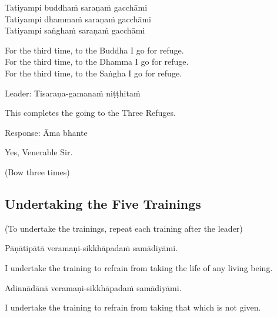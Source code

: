 Tatiyampi buddhaṁ saraṇaṁ gacchāmi\\
Tatiyampi dhammaṁ saraṇaṁ gacchāmi\\
Tatiyampi saṅghaṁ saraṇaṁ gacchāmi

\begin{english-verses}
  For the third time, to the Buddha I go for refuge.\\
  For the third time, to the Dhamma I go for refuge.\\
  For the third time, to the Saṅgha I go for refuge.
\end{english-verses}

Leader: Tisaraṇa-gamanaṁ niṭṭhitaṁ

\begin{english}
  This completes the going to the Three Refuges.
\end{english}

Response: Āma bhante

\begin{english}
  Yes, Venerable Sir.
\end{english}

\begin{center}
  (Bow three times)
\end{center}

\subsection{Undertaking the Five Trainings}

\begin{center}
  (To undertake the trainings, repeat each training after the leader)
\end{center}

Pāṇātipātā veramaṇi-sikkhāpadaṁ samādiyāmi.

\begin{english-hang}
  I undertake the training\hyperlink{endnote136-appendix}{\hypertarget{endnote136-body}{}}
  to refrain from taking the life of any living being.
\end{english-hang}

Adinnādānā veramaṇi-sikkhāpadaṁ samādiyāmi.

\begin{english}
  I undertake the training to refrain from taking that which is not given.
\end{english}

